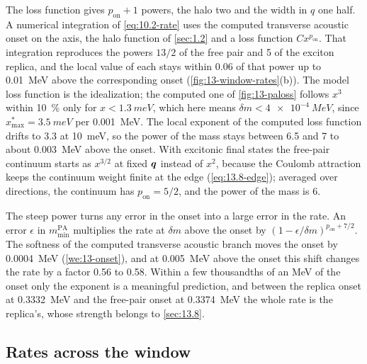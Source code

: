 \noindent The loss function gives $p_{\mathrm{on}} + 1$ powers, the halo two and the width in $q$ one half. A numerical integration of \cref{eq:10.2-rate} uses the computed transverse acoustic onset on the axis, the halo function of \cref{sec:1.2} and a loss function $Cx^{p_{\mathrm{on}}}$. That integration reproduces the powers $13/2$ of the free pair and 5 of the exciton replica, and the local value of each stays within 0.06 of that power up to \SI{0.01}{MeV} above the corresponding onset (\cref{fig:13-window-rates}(b)). The model loss function is the idealization; the computed one of \cref{fig:13-paloss} follows $x^3$ within \SI{10}{\percent} only for $x < \SI{1.3}{meV}$, which here means $\delta m < \SI{4e-4}{MeV}$, since $x_{\max}^* = \SI{3.5}{meV}$ per \SI{0.001}{MeV}. The local exponent of the computed loss function drifts to 3.3 at \SI{10}{meV}, so the power of the mass stays between 6.5 and 7 to about \SI{0.003}{MeV} above the onset. With excitonic final states the free-pair continuum starts as $x^{3/2}$ at fixed $\bm{q}$ instead of $x^2$, because the Coulomb attraction keeps the continuum weight finite at the edge (\cref{eq:13.8-edge}); averaged over directions, the continuum has $p_{\mathrm{on}} = 5/2$, and the power of the mass is 6.

The steep power turns any error in the onset into a large error in the rate. An error $\epsilon$ in $m_{\mathrm{min}}^{\mathrm{PA}}$ multiplies the rate at $\delta m$ above the onset by $(1 - \epsilon/\delta m)^{p_{\mathrm{on}} + 7/2}$. The softness of the computed transverse acoustic branch moves the onset by \SI{0.0004}{MeV} (\cref{we:13-onset}), and at \SI{0.005}{MeV} above the onset this shift changes the rate by a factor 0.56 to 0.58. Within a few thousandths of an MeV of the onset only the exponent is a meaningful prediction, and between the replica onset at \SI{0.3332}{MeV} and the free-pair onset at \SI{0.3374}{MeV} the whole rate is the replica's, whose strength belongs to \cref{sec:13.8}.

\subsection{Rates across the window}\label{sec:13.9-rates}

